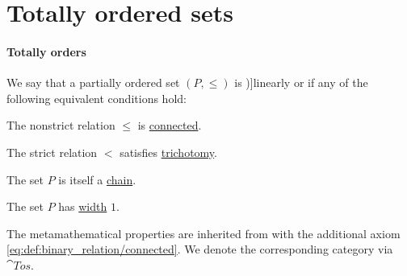 \section{Totally ordered sets}\label{sec:totally_ordered_sets}

\paragraph{Totally orders}

\begin{definition}\label{def:totally_ordered_set}
  We say that a partially ordered set \( (P, \leq) \) is \term[ru=линейно упорядоченое множество (\cite[def. 3.4]{Гуров2013ТеорияРешёток})]{linearly} or  if any of the following equivalent conditions hold:
  \begin{thmenum}
     The nonstrict relation \( \leq \) is \hyperref[def:binary_relation/connected]{connected}.

     The strict relation \( < \) satisfies \hyperref[def:binary_relation/trichotomy]{trichotomy}.

     The set \( P \) is itself a \hyperref[def:partial_order_chain/chain]{chain}.

     The set \( P \) has \hyperref[def:partial_order_chain/width]{width} \( 1 \).
  \end{thmenum}
\end{definition}
\begin{comments}
  \item The metamathematical properties are inherited from  with the additional axiom \eqref{eq:def:binary_relation/connected}. We denote the corresponding category via \( \cat{Tos} \).
\end{comments}
